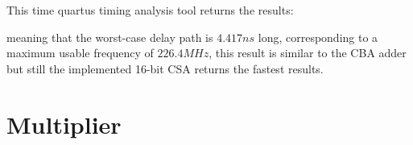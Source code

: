 \documentclass[12pt]{article}
\begin{document}
This time quartus timing analysis tool returns the results:
\begin{figure}[!h]
	\centering
	\begin{subfigure}{\linewidth}	
		\centering
	\end{subfigure}
	
\end{figure}

meaning that the worst-case delay path is $4.417 ns $ long, corresponding to a maximum usable frequency of $226.4MHz$,
this result is similar to the CBA adder but still the implemented 16-bit CSA returns the fastest results.
 



\newpage
\section{Multiplier}
\end{document}
